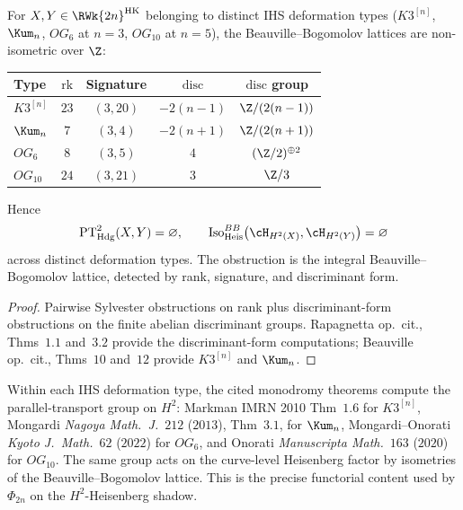 \begin{corollary}
\label{cor:rw-2n-cross-type-empty}
For $X, Y \in \RWk{2n}^{\mathrm{HK}}$ belonging to distinct IHS
deformation types \textup{(}$K3^{[n]}$, $\Kum_n$, $OG_6$ at $n = 3$,
$OG_{10}$ at $n = 5$\textup{),} the Beauville--Bogomolov lattices are
non-isometric over $\Z$:
\begin{center}
\begin{tabular}{lcccc}
\toprule
Type & $\mathrm{rk}$ & Signature & $\mathrm{disc}$ &
$\mathrm{disc}$ group \\
\midrule
$K3^{[n]}$ & $23$ & $(3, 20)$ & $-2(n-1)$ & $\Z/(2(n-1))$ \\
$\Kum_n$ & $7$ & $(3, 4)$ & $-2(n+1)$ & $\Z/(2(n+1))$ \\
$OG_6$ & $8$ & $(3, 5)$ & $4$ & $(\Z/2)^{\oplus 2}$ \\
$OG_{10}$ & $24$ & $(3, 21)$ & $3$ & $\Z/3$ \\
\bottomrule
\end{tabular}
\end{center}
Hence
\[
 \mathrm{PT}^2_{\mathrm{Hdg}}(X,Y)=\varnothing,
 \qquad
 \mathrm{Iso}_{\mathrm{Heis}}^{BB}
 \bigl(\cH_{H^2(X)},\cH_{H^2(Y)}\bigr)=\varnothing
\]
across distinct deformation types. The obstruction is the integral
Beauville--Bogomolov lattice, detected by rank, signature, and
discriminant form.
\end{corollary}

\begin{proof}
Pairwise Sylvester obstructions on rank plus discriminant-form
obstructions on the finite abelian discriminant groups. Rapagnetta
op.\ cit., Thms~$1.1$ and~$3.2$ provide the discriminant-form
computations; Beauville op.\ cit., Thms~$10$ and~$12$ provide
$K3^{[n]}$ and $\Kum_n$.
\end{proof}

\begin{remark}
\label{rem:rw-2n-markman-surjective}
Within each IHS deformation type, the cited monodromy theorems compute
the parallel-transport group on \(H^2\): Markman IMRN 2010 Thm~$1.6$
for \(K3^{[n]}\), Mongardi \emph{Nagoya Math.\ J.}~$212$
\textup{(}$2013$\textup{)}, Thm~$3.1$, for \(\Kum_n\),
Mongardi--Onorati \emph{Kyoto J.\ Math.}~$62$ \textup{(}$2022$\textup{)}
for \(OG_6\), and Onorati \emph{Manuscripta Math.}~$163$
\textup{(}$2020$\textup{)} for \(OG_{10}\). The same group acts on the
curve-level Heisenberg factor by isometries of the
Beauville--Bogomolov lattice. This is the precise functorial content
used by \(\Phi_{2n}\) on the \(H^2\)-Heisenberg shadow.
\end{remark}

